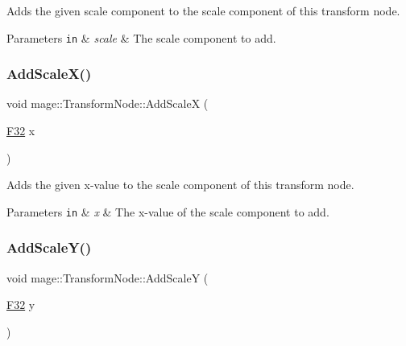 Adds the given scale component to the scale component of this transform node.


\begin{DoxyParams}[1]{Parameters}
\mbox{\tt in}  & {\em scale} & The scale component to add. \\
\hline
\end{DoxyParams}
\hypertarget{structmage_1_1_transform_node_acdf6f3a092fa47d428f3f4e9215160d9}{}\label{structmage_1_1_transform_node_acdf6f3a092fa47d428f3f4e9215160d9} 
\subsubsection{\texorpdfstring{Add\+Scale\+X()}{AddScaleX()}}
{\footnotesize\ttfamily void mage\+::\+Transform\+Node\+::\+Add\+ScaleX (\begin{DoxyParamCaption}\item[{\hyperlink{namespacemage_aa97e833b45f06d60a0a9c4fc22ae02c0}{F32}}]{x }\end{DoxyParamCaption})\hspace{0.3cm}{\ttfamily [noexcept]}}

Adds the given x-\/value to the scale component of this transform node.


\begin{DoxyParams}[1]{Parameters}
\mbox{\tt in}  & {\em x} & The x-\/value of the scale component to add. \\
\hline
\end{DoxyParams}
\hypertarget{structmage_1_1_transform_node_ab41eee8e27e8f155c7de643841953b45}{}\label{structmage_1_1_transform_node_ab41eee8e27e8f155c7de643841953b45} 
\subsubsection{\texorpdfstring{Add\+Scale\+Y()}{AddScaleY()}}
{\footnotesize\ttfamily void mage\+::\+Transform\+Node\+::\+Add\+ScaleY (\begin{DoxyParamCaption}\item[{\hyperlink{namespacemage_aa97e833b45f06d60a0a9c4fc22ae02c0}{F32}}]{y }\end{DoxyParamCaption})\hspace{0.3cm}{\ttfamily [noexcept]}}

